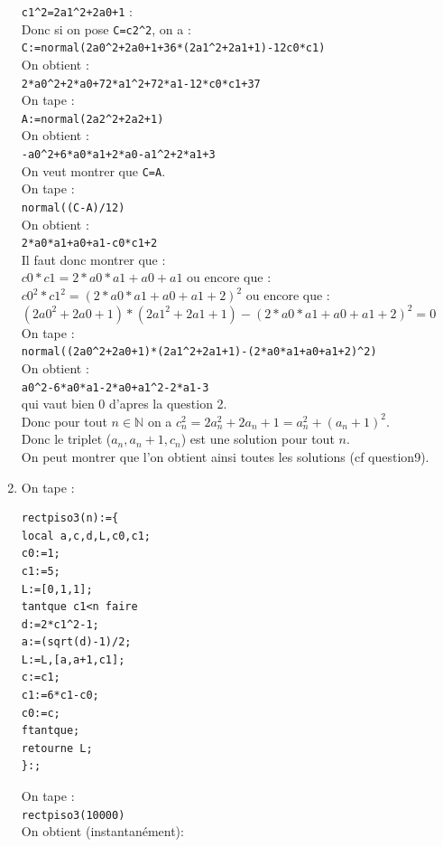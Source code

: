 \documentclass[a4paper,11pt]{book}
\newcommand{\N}{{\mathbb{N}}}
\begin{document}
\begin{enumerate}
 {\tt c1\verb|^|2=2a1\verb|^|2+2a0+1} :\\
Donc si on pose {\tt C=c2\verb|^|2}, on a :\\
{\tt C:=normal(2a0\verb|^|2+2a0+1+36*(2a1\verb|^|2+2a1+1)-12c0*c1)}\\
On obtient :\\
{\tt 2*a0\verb|^|2+2*a0+72*a1\verb|^|2+72*a1-12*c0*c1+37}\\
On tape :\\
{\tt A:=normal(2a2\verb|^|2+2a2+1)}\\
On obtient :\\
{\tt -a0\verb|^|2+6*a0*a1+2*a0-a1\verb|^|2+2*a1+3}\\
On veut montrer que {\tt C=A}.\\
On tape :\\
{\tt normal((C-A)/12)}\\
On obtient :\\
{\tt 2*a0*a1+a0+a1-c0*c1+2}\\
Il faut donc montrer que :\\
$c0*c1=2*a0*a1+a0+a1$ ou encore que :\\
$c0^2*c1^2=(2*a0*a1+a0+a1+2)^2$ ou encore que :\\
$(2a0^2+2a0+1)*(2a1^2+2a1+1)-(2*a0*a1+a0+a1+2)^2=0$\\
On tape :\\
{\tt normal((2a0\verb|^|2+2a0+1)*(2a1\verb|^|2+2a1+1)-(2*a0*a1+a0+a1+2)\verb|^|2)}\\
On obtient :\\
{\tt a0\verb|^|2-6*a0*a1-2*a0+a1\verb|^|2-2*a1-3}\\
qui vaut bien 0 d'apres la question 2.\\
Donc pour tout $n\in \N$ on a $c_n^2=2a_n^2+2a_n+1=a_n^2+(a_n+1)^2$.\\
Donc le triplet ($a_n,a_n+1,c_n$) est une solution pour tout $n$.\\
On peut montrer que l'on obtient ainsi toutes les solutions (cf question9).
\item On tape :
\begin{verbatim}
rectpiso3(n):={
local a,c,d,L,c0,c1;
c0:=1;
c1:=5;
L:=[0,1,1];
tantque c1<n faire
d:=2*c1^2-1;
a:=(sqrt(d)-1)/2;
L:=L,[a,a+1,c1];
c:=c1;
c1:=6*c1-c0;
c0:=c;
ftantque;
retourne L;
}:;
\end{verbatim}
On tape :\\
{\tt rectpiso3(10000)}\\
On obtient (instantan\'ement):\\

\end{enumerate}
\end{document}
